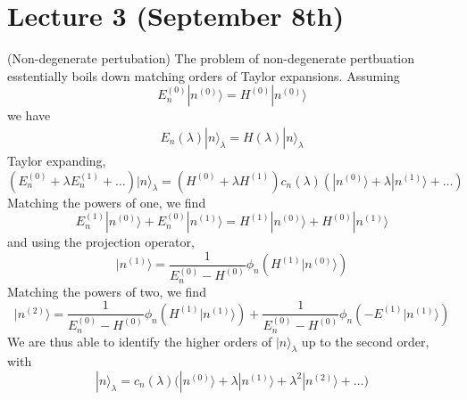\section{Lecture 3 (September 8th)}
\begin{defi}
(Non-degenerate pertubation) The problem of non-degenerate pertbuation esstentially boils down matching orders of Taylor expansions. Assuming 
\[E_{n}^{(0)}|n^{(0)}\rangle =H^{(0)}|n^{(0)}\rangle \]
we have
\[\begin{align*}
E_{n}(\lambda )|n\rangle _{\lambda}=H(\lambda )|n\rangle _{\lambda }
\end{align*}\]
Taylor expanding,
\[(E_{n}^{(0)}+\lambda E_{n}^{(1)}+\ldots )|n\rangle _{\lambda }=(H^{(0)}+\lambda H^{(1)})c_{n}(\lambda )(|n^{(0)}\rangle +\lambda |n^{(1)}\rangle +\ldots )\]
Matching the powers of one, we find
\[E_{n}^{(1)}|n^{(0)}\rangle +E_{n}^{(0)}|n^{(1)}\rangle =H^{(1)}|n^{(0)}\rangle +H^{(0)}|n^{(1)}\rangle \]
and using the projection operator,
\[|n^{(1)}\rangle =\dfrac{1}{E_{n}^{(0)}-H^{(0)}}\phi _{n}(H^{(1)}|n^{(0)}\rangle) \]
Matching the powers of two, we find
\[|n^{(2)}\rangle =\dfrac{1}{E_{n}^{(0)}-H^{(0)}}\phi _{n}(H^{(1)}|n^{(1)}\rangle) +\dfrac{1}{E_{n}^{(0)}-H^{(0)}}\phi   _{n}(-E^{(1)}|n^{(1)}\rangle )\]
We are thus able to identify the higher orders of $|n\rangle _{\lambda }$ up to the second order, with
\[|n\rangle _{\lambda }=c_{n}(\lambda )\Big(|n^{(0)}\rangle +\lambda |n^{(1)}\rangle +\lambda ^2|n^{(2)}\rangle +\ldots \Big)\]

\end{defi}
\vspace{2ex}

\vspace{2ex}

